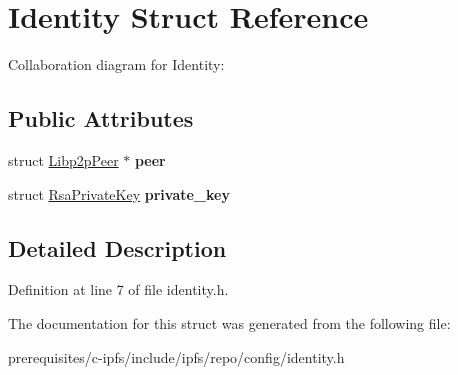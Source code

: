 \hypertarget{struct_identity}{}\section{Identity Struct Reference}
\label{struct_identity}


Collaboration diagram for Identity\+:
\subsection*{Public Attributes}
\begin{DoxyCompactItemize}
\item 
\mbox{\label{struct_identity_a1f42d83ac1b2cfdfb67edc45270751f1}} 
struct \mbox{\hyperlink{struct_libp2p_peer}{Libp2p\+Peer}} $\ast$ {\bfseries peer}
\item 
\mbox{\label{struct_identity_a559d59644fa17b60771c90d624075209}} 
struct \mbox{\hyperlink{struct_rsa_private_key}{Rsa\+Private\+Key}} {\bfseries private\+\_\+key}
\end{DoxyCompactItemize}


\subsection{Detailed Description}


Definition at line 7 of file identity.\+h.



The documentation for this struct was generated from the following file\+:\begin{DoxyCompactItemize}
\item 
prerequisites/c-\/ipfs/include/ipfs/repo/config/identity.\+h\end{DoxyCompactItemize}
